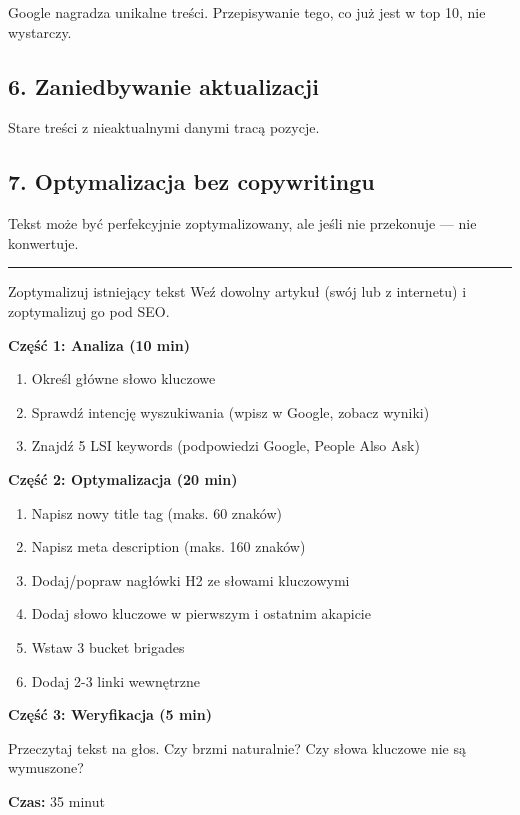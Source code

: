 \documentclass[
  12pt,
  a4paper,
  twoside,
  openright,
  12pt,
  DIV=12,
  BCOR=12mm]{scrbook}
\newcommand{\decoline}{%
  \begin{center}
    \textcolor{bordergray}{\rule{0.3\textwidth}{0.5pt}}
  \end{center}
}
\begin{document}
Google nagradza unikalne treści. Przepisywanie tego, co już jest w top
10, nie wystarczy.

\subsection{6. Zaniedbywanie
aktualizacji}\label{zaniedbywanie-aktualizacji}

Stare treści z nieaktualnymi danymi tracą pozycje.

\subsection{7. Optymalizacja bez
copywritingu}\label{optymalizacja-bez-copywritingu}

Tekst może być perfekcyjnie zoptymalizowany, ale jeśli nie przekonuje
--- nie konwertuje.

\decoline

\begin{cwiczenie}{Zoptymalizuj istniejący tekst}
Weź dowolny artykuł (swój lub z internetu) i zoptymalizuj go pod SEO.

\textbf{Część 1: Analiza (10 min)}

\begin{enumerate}
  \item Określ główne słowo kluczowe
  \item Sprawdź intencję wyszukiwania (wpisz w Google, zobacz wyniki)
  \item Znajdź 5 LSI keywords (podpowiedzi Google, People Also Ask)
\end{enumerate}

\textbf{Część 2: Optymalizacja (20 min)}

\begin{enumerate}
  \item Napisz nowy title tag (maks. 60 znaków)
  \item Napisz meta description (maks. 160 znaków)
  \item Dodaj/popraw nagłówki H2 ze słowami kluczowymi
  \item Dodaj słowo kluczowe w pierwszym i ostatnim akapicie
  \item Wstaw 3 bucket brigades
  \item Dodaj 2-3 linki wewnętrzne
\end{enumerate}

\textbf{Część 3: Weryfikacja (5 min)}

Przeczytaj tekst na głos. Czy brzmi naturalnie? Czy słowa kluczowe nie są wymuszone?

\textbf{Czas:} 35 minut
\end{cwiczenie}
\end{document}

